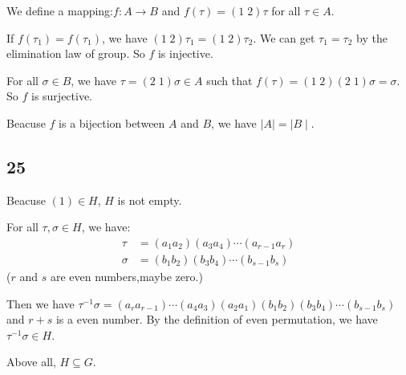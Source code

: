 \documentclass{article}
\begin{document}
			We define a mapping:$f: A \rightarrow B$ and $f(\tau) = (1 \; 2)\tau$ for
			all $\tau \in A$.

			If $f(\tau_1) = f(\tau_1)$, we have $(1 \; 2)\tau_1 = (1 \; 2)\tau_2$. We
			can get $\tau_1 = \tau_2$ by the elimination law of group. So $f$ is
			injective.

			For all $\sigma \in B$, we have $\tau = (2 \; 1)\sigma \in A$ such that
			$f(\tau) = (1 \; 2)(2 \; 1)\sigma = \sigma$. So $f$ is surjective.
			
			Beacuse $f$ is a bijection between $A$ and $B$, we have $\mid A \mid =
			\mid B \mid$.
		\subsection*{25}
			Beacuse $(1) \in H$, $H$ is not empty.

			For all $\tau, \sigma \in H$, we have:
			\begin{align*}
				\tau & = (a_1a_2)(a_3a_4)\cdots(a_{r-1}a_r) \\
				\sigma & = (b_1b_2)(b_3b_4)\cdots(b_{s-1}b_s) 
			\end{align*}
			($r$ and $s$ are even numbers,maybe zero.)

			Then we have $\tau^{-1}\sigma =
			(a_ra_{r-1})\cdots(a_4a_3)(a_2a_1)(b_1b_2)(b_3b_4)\cdots(b_{s-1}b_s)$ and
			$r + s$ is a even number. By the definition of even permutation, we have $\tau^{-1}\sigma \in H$.

			Above all, $H \subseteq G$.
\end{document}

